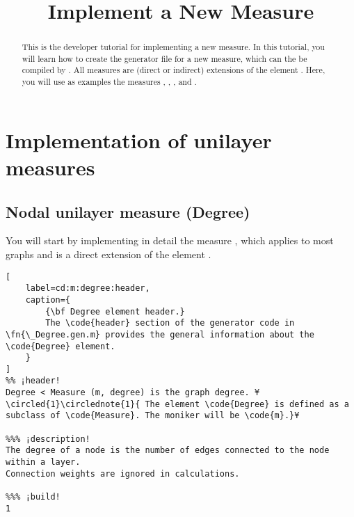 \documentclass{tufte-handout}
\title{Implement a New Measure}
\begin{document}
\maketitle

\begin{abstract}
\noindent
This is the developer tutorial for implementing a new measure. 
In this tutorial, you will learn how to create the generator file  for a new measure, which can the be compiled by . All measures are (direct or indirect) extensions of the element . Here, you will use as examples the measures , , , and .
\end{abstract}

\tableofcontents

\clearpage
\section{Implementation of unilayer measures}

\subsection{Nodal unilayer measure (Degree)}

You will start by implementing in detail the measure , which applies to most graphs and is a direct extension of the element .

\begin{lstlisting}[
	label=cd:m:degree:header,
	caption={
		{\bf Degree element header.}
		The \code{header} section of the generator code in \fn{\_Degree.gen.m} provides the general information about the \code{Degree} element.
	}
]
%% ¡header!
Degree < Measure (m, degree) is the graph degree. ¥\circled{1}\circlednote{1}{ The element \code{Degree} is defined as a subclass of \code{Measure}. The moniker will be \code{m}.}¥

%%% ¡description!
The degree of a node is the number of edges connected to the node within a layer. 
Connection weights are ignored in calculations.

%%% ¡build!
1
\end{lstlisting}
\end{document}
